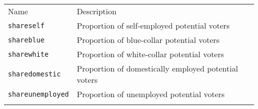 \documentclass[]{article}
\begin{document}
\begin{longtable}[c]{@{}ll@{}}
\toprule\addlinespace
\begin{minipage}[b]{0.24\columnwidth}\raggedright
Name
\end{minipage} & \begin{minipage}[b]{0.69\columnwidth}\raggedright
Description
\end{minipage}
\\\addlinespace
\midrule\endhead
\begin{minipage}[t]{0.24\columnwidth}\raggedright
\texttt{shareself}
\end{minipage} & \begin{minipage}[t]{0.69\columnwidth}\raggedright
Proportion of self-employed potential voters
\end{minipage}
\\\addlinespace
\begin{minipage}[t]{0.24\columnwidth}\raggedright
\texttt{shareblue}
\end{minipage} & \begin{minipage}[t]{0.69\columnwidth}\raggedright
Proportion of blue-collar potential voters
\end{minipage}
\\\addlinespace
\begin{minipage}[t]{0.24\columnwidth}\raggedright
\texttt{sharewhite}
\end{minipage} & \begin{minipage}[t]{0.69\columnwidth}\raggedright
Proportion of white-collar potential voters
\end{minipage}
\\\addlinespace
\begin{minipage}[t]{0.24\columnwidth}\raggedright
\texttt{sharedomestic}
\end{minipage} & \begin{minipage}[t]{0.69\columnwidth}\raggedright
Proportion of domestically employed potential voters
\end{minipage}
\\\addlinespace
\begin{minipage}[t]{0.24\columnwidth}\raggedright
\texttt{shareunemployed}
\end{minipage} & \begin{minipage}[t]{0.69\columnwidth}\raggedright
Proportion of unemployed potential voters
\end{minipage}
\\\addlinespace
\begin{minipage}[t]{0.24\columnwidth}\raggedright

\end{minipage}
\end{longtable}
\end{document}

